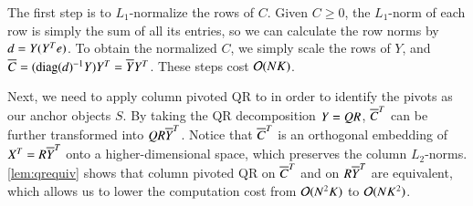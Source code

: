 The first step is to $L_1$\hyp{}normalize the rows of $C$. Given $C \geq 0$, 
the $L_1$\hyp{}norm of each row is simply the sum of all its entries, so we can
calculate the row norms by $d \mathrel{=} Y(Y^Te)$. To obtain the normalized $C$, we
simply scale the rows of $Y$, and $\overline{C} \mathrel{=} (\operatorname{diag}(d)^{-1}Y)Y^T \mathrel{=} \overline{Y} 
Y^T$. These steps cost $\mathcal{O}(NK)$.

Next, we need to apply column pivoted QR to  in order to
identify the pivots as our anchor objects $S$. By taking the QR decomposition
$Y \mathrel{=} QR$, $\overline{C}^T$ can be further transformed into $QR\overline{Y}^T$. Notice that
$\overline{C}^T$ is an orthogonal embedding of $X^T = R\overline{Y}^T$ onto a
higher\hyp{}dimensional space, which preserves the column $L_2$\hyp{}norms.
\cref{lem:qrequiv} shows that column pivoted QR on $\overline{C}^T$ and on $R\overline{Y}^T$
are equivalent, which allows us to lower the computation cost from $\mathcal{O}(N^2K)$
to $\mathcal{O}(NK^2)$.

